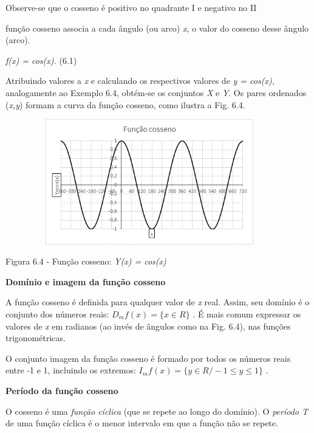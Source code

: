 \begin{texemplo}
Observe-se que o cosseno é positivo no quadrante I e negativo no II \qedsymbol
\end{texemplo}

\begin{caixa}
função cosseno associa a cada ângulo (ou arco) \textit{x}, o valor do cosseno desse ângulo (arco).

\textit{f(x) = cos(x).} \tab (6.1)
\end{caixa}
Atribuindo valores a \textit{x} e calculando os respectivos valores de \textit{y = cos(x)}, analogamente ao Exemplo 6.4, obtém-se os conjuntos \textit{X }e\textit{ Y}. Os pares ordenados (\textit{x,y}) formam a curva da função cosseno, como ilustra a Fig. 6.4.

\begin{figure}[H]
    \begin{Center}
        \includegraphics[width=4.11in,height=2.14in]{capitulos/trigonometria_e_funcoes_trigonometricas/media/image31.png}
    \end{Center}
\end{figure}

Figura 6.4 - Função cosseno: \textit{Y(x) = cos(x)}

\textbf{Domínio e imagem da função cosseno}

A função cosseno é definida para qualquer valor de \textit{x} real. Assim, seu domínio é o conjunto dos números reais:  \( D_{m}f \left( x \right) = \{ x \in  R \}  \) . É mais comum expressar os valores de \textit{x} em radianos (ao invés de ângulos como na Fig. 6.4), nas funções trigonométricas.

O conjunto imagem da função cosseno é formado por todos os números reais entre -1 e 1, incluindo os extremos:  \( I_{m}f \left( x \right) = \{ y \in  R/ -1 \leq y \leq 1 \}  \) .

\textbf{Período da função cosseno}

O cosseno é uma \textit{função cíclica} (que se repete ao longo do domínio). O \textit{período T} de uma função cíclica é o menor intervalo em que a função não se repete.

